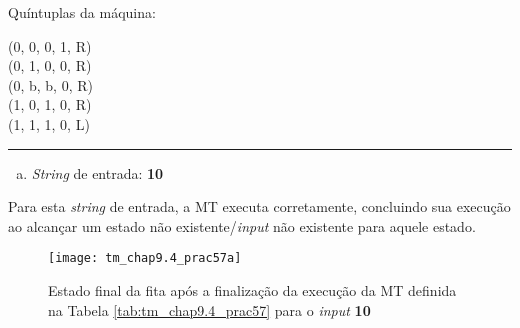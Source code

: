 \begin{table}[H]
    \begin{minipage}{.5\linewidth}
        \begin{flushright}
            Quíntuplas da máquina:\hspace*{1ex}    %
        \end{flushright}
    \end{minipage}%
    \begin{minipage}{.5\linewidth}
            \ttfamily
            \hspace*{1ex}(0, 0, 0, 1, R) \\        %
            \hspace*{1ex}(0, 1, 0, 0, R) \\        %
            \hspace*{1ex}(0, b, b, 0, R) \\        %
            \hspace*{1ex}(1, 0, 1, 0, R) \\        %
            \hspace*{1ex}(1, 1, 1, 0, L)           %
    \end{minipage}

    \caption{\cite[p.\ 764, Practice 57]{judith}}
    \label{tab:tm_chap9.4_prac57}
\end{table}

\hrule
\vspace{\baselineskip}
\begin{enumerate}[a.]
    \item \textit{String} de entrada: \textbf{10}
\end{enumerate}

\noindent
Para esta \textit{string} de entrada, a MT executa corretamente, concluindo sua
execução ao alcançar um estado não existente/\textit{input} não existente para
aquele estado.

\begin{figure}[H]
    \centering
    \texttt{[image: tm\_chap9.4\_prac57a]}
    \caption{
        Estado final da fita após a finalização da execução da MT definida na
        Tabela \ref{tab:tm_chap9.4_prac57} para o \textit{input} \textbf{10}
    }
    \label{fig:tm_chap9.4_prac57a}
\end{figure}

